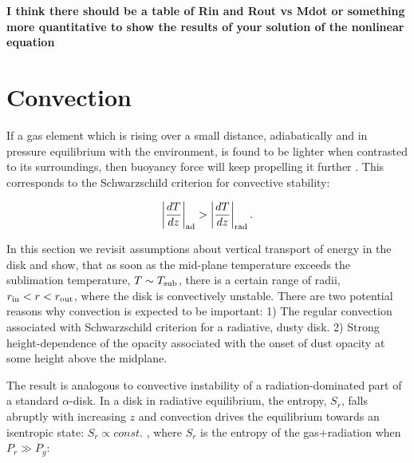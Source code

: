\documentclass[12pt,english,preprint]{aastex}
\newcommand{\Tc}{T}
\begin{document}
  

{\bf I think there should be a table of Rin and Rout vs Mdot or something more quantitative to show the results of your solution of the nonlinear equation}

\section{Convection}

If a gas element which is rising over a small distance, adiabatically
and in pressure equilibrium with the environment, is found to 
be lighter when contrasted to its surroundings, then
buoyancy force will keep propelling it further \citep{KippenhahnWeigert94}.
This corresponds to the  Schwarzschild criterion for convective
stability:

\begin{equation}
\left|\frac{dT}{dz}\right|_{{\rm ad}}>\left|\frac{dT}{dz}\right|_{{\rm rad}}\mbox{.}\label{eq:SchwarzschildCrit}
\end{equation}


In this section we revisit assumptions about vertical transport of
energy in the disk 
and show, that as soon as the mid-plane 
temperature exceeds the sublimation temperature, $\Tc \sim T_{{\rm sub}}$, there is a certain range of radii, 
$r_{{\rm in}}<r<r_{{\rm out}}$, where the disk is convectively unstable. There are two potential reasons why
convection is expected to be important: 1) The regular convection
associated with Schwarzschild criterion for a radiative, dusty disk. 2) Strong height-dependence of the opacity associated with the onset of dust opacity at some height above the midplane.


The result is analogous to convective instability of a radiation-dominated 
part of a standard $\alpha$-disk. 
In a disk in radiative equilibrium, the entropy, $S_r$, falls abruptly with increasing $z$ and
convection drives the equilibrium towards an isentropic
state: $S_{r}\propto const.$ \citep{BKBlinn77}, where $S_{r}$ is
the entropy of the gas+radiation when $P_r\gg P_{g}$:
\end{document}
